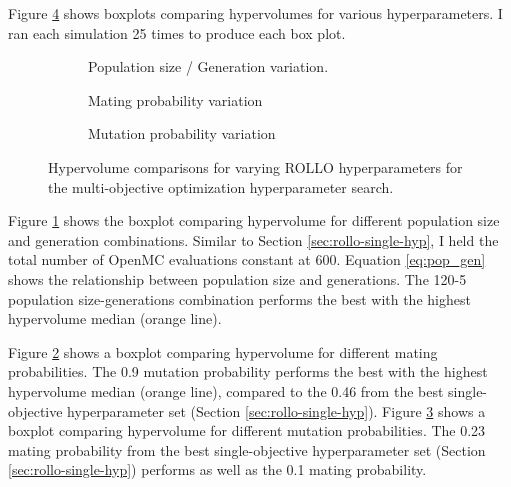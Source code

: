 Figure \ref{fig:hypervolume-comparison} shows boxplots comparing hypervolumes 
for various hyperparameters. 
I ran each simulation 25 times to produce each box plot. 
\begin{figure}[htbp]
    \centering
    \begin{subfigure}{0.55\textwidth}
    \caption{Population size / Generation variation.}
    \label{fig:hypervolume-comparison-gens}
    \end{subfigure}
    \begin{subfigure}{0.55\textwidth}
        \caption{Mating probability variation}
        \label{fig:hypervolume-comparison-matpb}
    \end{subfigure}
    \begin{subfigure}{0.55\textwidth}
        \caption{Mutation probability variation}
        \label{fig:hypervolume-comparison-mutpb}
    \end{subfigure}
    \caption{Hypervolume comparisons for varying \acrfull{ROLLO} hyperparameters for the
    multi-objective optimization hyperparameter search. }
    \label{fig:hypervolume-comparison}
\end{figure}
Figure \ref{fig:hypervolume-comparison-gens} shows the boxplot comparing hypervolume 
for different population size and generation combinations. 
Similar to Section \ref{sec:rollo-single-hyp}, I held the total number of OpenMC 
evaluations constant at 600. 
Equation \ref{eq:pop_gen} shows the relationship between population size and generations. 
The 120-5 population size-generations combination performs the best with the highest 
hypervolume median (orange line). 

Figure \ref{fig:hypervolume-comparison-matpb} shows a boxplot comparing hypervolume 
for different mating probabilities. 
The 0.9 mutation probability performs the best with the highest hypervolume median 
(orange line), compared to the 0.46 from the best single-objective hyperparameter set 
(Section \ref{sec:rollo-single-hyp}). 
Figure \ref{fig:hypervolume-comparison-mutpb} shows a boxplot comparing hypervolume 
for different mutation probabilities. 
The 0.23 mating probability from the best single-objective hyperparameter set 
(Section \ref{sec:rollo-single-hyp}) performs as well as the 0.1 mating probability. 

